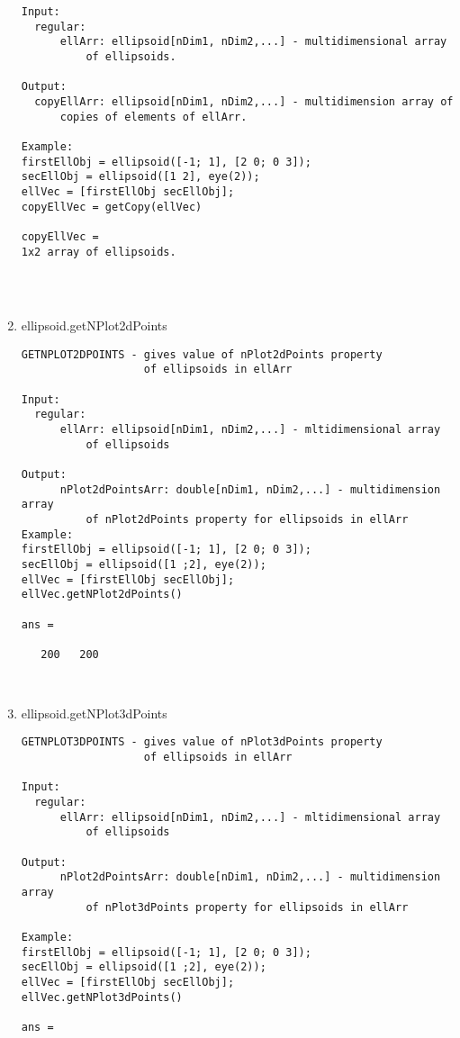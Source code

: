 \begin{enumerate}
\begin{lstlisting}
Input:
  regular:
      ellArr: ellipsoid[nDim1, nDim2,...] - multidimensional array
          of ellipsoids.

Output:
  copyEllArr: ellipsoid[nDim1, nDim2,...] - multidimension array of
      copies of elements of ellArr.

Example:
firstEllObj = ellipsoid([-1; 1], [2 0; 0 3]);
secEllObj = ellipsoid([1 2], eye(2));
ellVec = [firstEllObj secEllObj];
copyEllVec = getCopy(ellVec)

copyEllVec =
1x2 array of ellipsoids.




\end{lstlisting}
\fontfamily{\familydefault}
\selectfont
\item {ellipsoid.getNPlot2dPoints}
\selectfont
\begin{lstlisting}
GETNPLOT2DPOINTS - gives value of nPlot2dPoints property
                   of ellipsoids in ellArr

Input:
  regular:
      ellArr: ellipsoid[nDim1, nDim2,...] - mltidimensional array
          of ellipsoids

Output:
      nPlot2dPointsArr: double[nDim1, nDim2,...] - multidimension array
          of nPlot2dPoints property for ellipsoids in ellArr
Example:
firstEllObj = ellipsoid([-1; 1], [2 0; 0 3]);
secEllObj = ellipsoid([1 ;2], eye(2));
ellVec = [firstEllObj secEllObj];
ellVec.getNPlot2dPoints()

ans =

   200   200



\end{lstlisting}
\fontfamily{\familydefault}
\selectfont
\item {ellipsoid.getNPlot3dPoints}
\selectfont
\begin{lstlisting}
GETNPLOT3DPOINTS - gives value of nPlot3dPoints property
                   of ellipsoids in ellArr

Input:
  regular:
      ellArr: ellipsoid[nDim1, nDim2,...] - mltidimensional array
          of ellipsoids

Output:
      nPlot2dPointsArr: double[nDim1, nDim2,...] - multidimension array
          of nPlot3dPoints property for ellipsoids in ellArr

Example:
firstEllObj = ellipsoid([-1; 1], [2 0; 0 3]);
secEllObj = ellipsoid([1 ;2], eye(2));
ellVec = [firstEllObj secEllObj];
ellVec.getNPlot3dPoints()

ans =


\end{lstlisting}
\end{enumerate}
